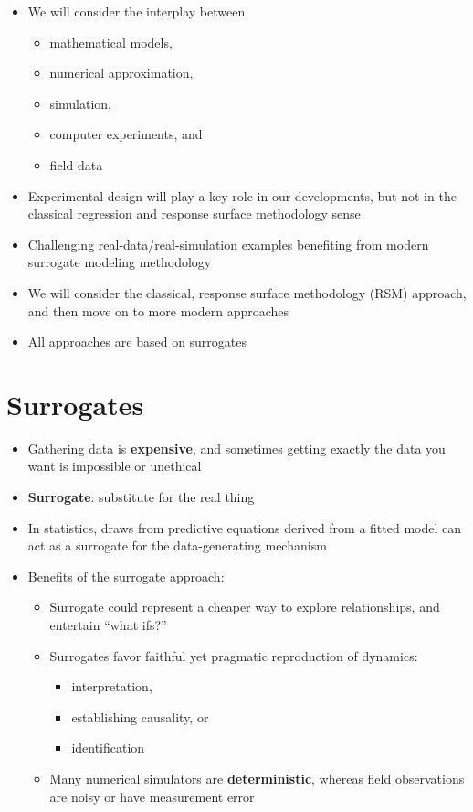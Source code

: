\documentclass[
  letterpaper,
  DIV=11,
  numbers=noendperiod]{scrreprt}
\providecommand{\tightlist}{%
  \setlength{\itemsep}{0pt}\setlength{\parskip}{0pt}}\usepackage{longtable,booktabs,array}
\begin{document}
\begin{itemize}
\tightlist
\item
  We will consider the interplay between

  \begin{itemize}
  \tightlist
  \item
    mathematical models,
  \item
    numerical approximation,
  \item
    simulation,
  \item
    computer experiments, and
  \item
    field data
  \end{itemize}
\item
  Experimental design will play a key role in our developments, but not
  in the classical regression and response surface methodology sense
\item
  Challenging real-data/real-simulation examples benefiting from modern
  surrogate modeling methodology
\item
  We will consider the classical, response surface methodology (RSM)
  approach, and then move on to more modern approaches
\item
  All approaches are based on surrogates
\end{itemize}

\section{Surrogates}\label{surrogates}

\begin{itemize}
\tightlist
\item
  Gathering data is \textbf{expensive}, and sometimes getting exactly
  the data you want is impossible or unethical
\item
  \textbf{Surrogate}: substitute for the real thing
\item
  In statistics, draws from predictive equations derived from a fitted
  model can act as a surrogate for the data-generating mechanism
\item
  Benefits of the surrogate approach:

  \begin{itemize}
  \tightlist
  \item
    Surrogate could represent a cheaper way to explore relationships,
    and entertain ``what ifs?''
  \item
    Surrogates favor faithful yet pragmatic reproduction of dynamics:

    \begin{itemize}
    \tightlist
    \item
      interpretation,
    \item
      establishing causality, or
    \item
      identification
    \end{itemize}
  \item
    Many numerical simulators are \textbf{deterministic}, whereas field
    observations are noisy or have measurement error
  \end{itemize}
\end{itemize}
\end{document}
